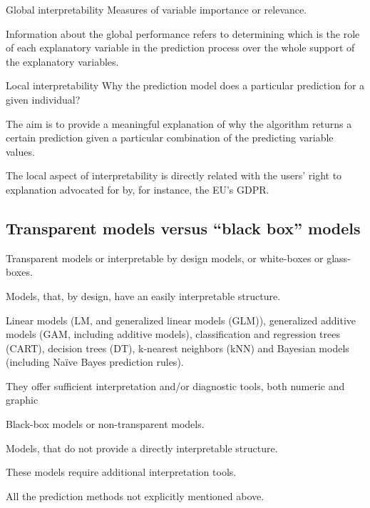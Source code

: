 \begin{definition}{Global interpretability}{}
	Measures of variable importance or relevance.

	Information about the global performance refers to determining which
	is the role of each explanatory variable in the prediction
	process over the whole support of the explanatory variables.
\end{definition}

\begin{definition}{Local interpretability}{}
	Why the prediction model does a particular prediction for a given individual?

	The aim is to provide a meaningful explanation of why the algorithm returns a
	certain prediction given a particular combination of the predicting variable values.

	\tcblower

	\begin{note}
		The local aspect of interpretability is directly related with the users’
		right to explanation advocated for by, for instance, the EU’s GDPR.
	\end{note}
\end{definition}

\subsection{Transparent models versus ``black box'' models}

\begin{definition}{Transparent models}{}
	or interpretable by design models, or white-boxes or glass-boxes.

	Models, that, by design, have an easily interpretable structure.

	Linear models (LM, and generalized linear models (GLM)),
	generalized additive models (GAM, including additive models),
	classification and regression trees (CART),
	decision trees (DT), k-nearest neighbors (kNN) and
	Bayesian models (including Naïve Bayes prediction rules).

	They offer sufficient interpretation and/or diagnostic tools, both numeric and graphic
\end{definition}

\begin{definition}{Black-box models}{}
	or non-transparent models.

	Models, that do not provide a directly interpretable structure.

	These models require additional interpretation tools.

	All the prediction methods not explicitly mentioned above.
\end{definition}

